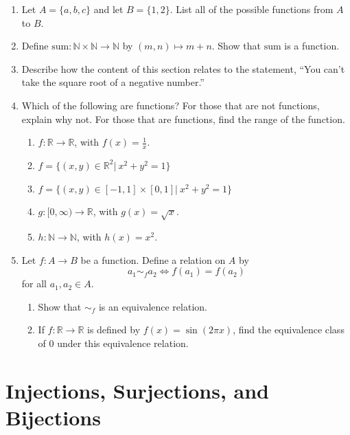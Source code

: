 \documentclass[
]{book}
\let\stdsection\section
\renewcommand\section{\newpage\stdsection}
\theoremstyle{definition}
\theoremstyle{definition}
\theoremstyle{definition}
\theoremstyle{definition}
\theoremstyle{remark}
\begin{document}
\begin{enumerate}
\def\labelenumi{\arabic{enumi}.}
\item
  Let \(A=\{a,b,c\}\) and let \(B=\{1,2\}\). List all of the possible functions from \(A\) to \(B\).
\item
  Define \(\mathrm{sum}:\mathbb{N}\times \mathbb{N} \rightarrow \mathbb{N}\) by \((m,n) \mapsto m+n\). Show that \(\mathrm{sum}\) is a function.
\item
  Describe how the content of this section relates to the statement, ``You can't take the square root of a negative number.''
\item
  Which of the following are functions? For those that are not functions, explain why not. For those that are functions, find the range of the function.

  \begin{enumerate}
  \def\labelenumii{\alph{enumii}.}
  \item
    \(f:\mathbb{R} \rightarrow \mathbb{R}\), with \(f(x)=\frac{1}{x}\).
  \item
    \(f= \{(x,y)\in \mathbb{R}^2\vert \: x^2+y^2=1\}\)
  \item
    \(f= \{(x,y) \in [-1,1]\times [0,1] \vert \: x^2+y^2=1\}\)
  \item
    \(g:[0,\infty) \rightarrow \mathbb{R}\), with \(g(x)=\sqrt{x}\).
  \item
    \(h:\mathbb{N} \rightarrow \mathbb{N}\), with \(h(x)=x^2\).
  \end{enumerate}
\item
  Let \(f:A\rightarrow B\) be a function. Define a relation on \(A\) by \[a_1 \sim_f a_2 \Leftrightarrow f(a_1)=f(a_2)\] for all \(a_1,a_2\in A\).

  \begin{enumerate}
  \def\labelenumii{\alph{enumii}.}
  \item
    Show that \(\sim_f\) is an equivalence relation.
  \item
    If \(f:\mathbb{R} \rightarrow \mathbb{R}\) is defined by \(f(x)=\sin(2\pi x)\), find the equivalence class of \(0\) under this equivalence relation.
  \end{enumerate}
\end{enumerate}

\hypertarget{Bijection}{%
\section{Injections, Surjections, and Bijections}\label{Bijection}}
\end{document}
